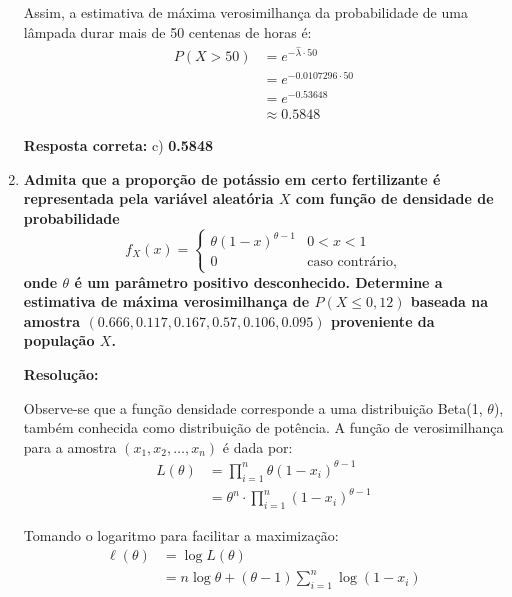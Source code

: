 \documentclass[a4paper,12pt]{article}
\begin{document}
\begin{enumerate}
\begin{mdframed}[backgroundcolor=gray!10, linewidth=0pt, innertopmargin=10pt, innerbottommargin=10pt]
    Assim, a estimativa de máxima verosimilhança da probabilidade de uma lâmpada durar mais de 50 centenas de horas é:
    \begin{align*}
    P(X > 50) &= e^{-\hat{\lambda} \cdot 50} \\
    &= e^{-0.0107296 \cdot 50} \\
    &= e^{-0.53648} \\
    &\approx 0.5848
    \end{align*}

    \textbf{Resposta correta:} c) \textbf{0.5848}
    \end{mdframed}

    \vspace{0.5cm}
    
    \item \textbf{Admita que a proporção de potássio em certo fertilizante é representada pela variável aleatória \( X \) com função de densidade de probabilidade}
    \[
    f_X(x) = 
    \begin{cases} 
    \theta(1 - x)^{\theta-1} & 0 < x < 1 \\ 
    0 & \text{caso contrário,}
    \end{cases}
    \]
    \textbf{onde \( \theta \) é um parâmetro positivo desconhecido. Determine a estimativa de máxima verosimilhança de \( P(X \leq 0{,}12) \) baseada na amostra \( (0.666, 0.117, 0.167, 0.57, 0.106, 0.095) \) proveniente da população \( X \).}

    \vspace{0.3cm}

    \begin{mdframed}[backgroundcolor=gray!10, linewidth=0pt, innertopmargin=10pt, innerbottommargin=10pt]
    \textbf{Resolução:}

    Observe-se que a função densidade corresponde a uma distribuição Beta(1, \( \theta \)), também conhecida como distribuição de potência. A função de verosimilhança para a amostra \( (x_1, x_2, \dots, x_n) \) é dada por:
    \begin{align*}
    L(\theta) &= \prod_{i=1}^{n} \theta (1 - x_i)^{\theta - 1} \\
    &= \theta^n \cdot \prod_{i=1}^{n} (1 - x_i)^{\theta - 1}
    \end{align*}

    Tomando o logaritmo para facilitar a maximização:
    \begin{align*}
    \ell(\theta) &= \log L(\theta) \\
    &= n \log \theta + (\theta - 1) \sum_{i=1}^{n} \log(1 - x_i)
    \end{align*}


\end{mdframed}
\end{enumerate}
\end{document}
